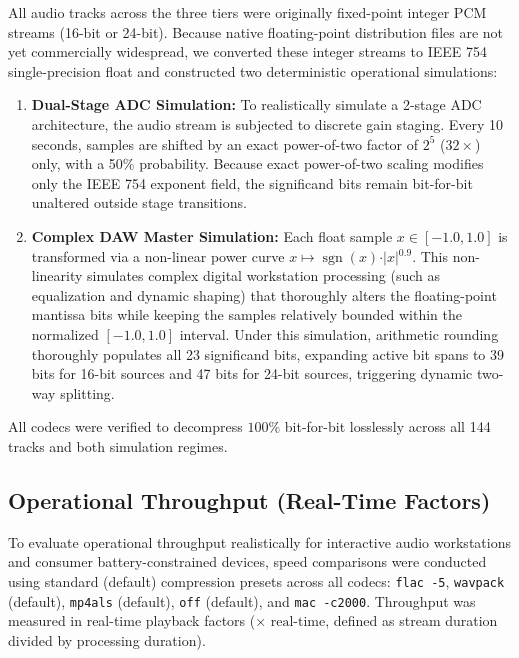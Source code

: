 \documentclass[10pt,twocolumn]{article}
\begin{document}
All audio tracks across the three tiers were originally fixed-point integer PCM streams (16-bit or 24-bit). Because native floating-point distribution files are not yet commercially widespread, we converted these integer streams to IEEE 754 single-precision float and constructed two deterministic operational simulations:
\begin{enumerate}
	\item \textbf{Dual-Stage ADC Simulation:} To realistically simulate a 2-stage ADC architecture, the audio stream is subjected to discrete gain staging. Every 10 seconds, samples are shifted by an exact power-of-two factor of $2^5$ ($32\times$) only, with a 50\% probability. Because exact power-of-two scaling modifies only the IEEE 754 exponent field, the significand bits remain bit-for-bit unaltered outside stage transitions.
	\item \textbf{Complex DAW Master Simulation:} Each float sample $x \in [-1.0, 1.0]$ is transformed via a non-linear power curve $x \mapsto \operatorname{sgn}(x) \cdot \vert{}x\vert{}^{0.9}$. This non-linearity simulates complex digital workstation processing (such as equalization and dynamic shaping) that thoroughly alters the floating-point mantissa bits while keeping the samples relatively bounded within the normalized $[-1.0, 1.0]$ interval. Under this simulation, arithmetic rounding thoroughly populates all 23 significand bits, expanding active bit spans to 39 bits for 16-bit sources and 47 bits for 24-bit sources, triggering dynamic two-way splitting.
\end{enumerate}

All codecs were verified to decompress $100\%$ bit-for-bit losslessly across all 144 tracks and both simulation regimes.

\subsection{Operational Throughput (Real-Time Factors)}
To evaluate operational throughput realistically for interactive audio workstations and consumer battery-constrained devices, speed comparisons were conducted using standard (default) compression presets across all codecs: \texttt{flac -5}, \texttt{wavpack} (default), \texttt{mp4als} (default), \texttt{off} (default), and \texttt{mac -c2000}. Throughput was measured in real-time playback factors ($\times\text{ real-time}$, defined as stream duration divided by processing duration).
\end{document}
